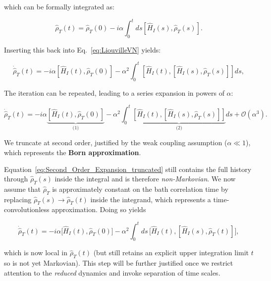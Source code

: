 \noindent
which can be formally integrated as:

\begin{equation}
	\hat{\rho}_T(t) = \hat{\rho}_T(0) - i \alpha \int_0^t ds [\hat{H}_I(s), \hat{\rho}_T(s)].
	\label{eq:Formal_Integration}
\end{equation}

\noindent
Inserting this back into Eq.~\eqref{eq:LiouvilleVN} yields:

\begin{equation}
	\dot{\hat{\rho}}_T(t) = -i \alpha \left[ \hat{H}_I(t), \hat{\rho}_T(0) \right]
	- \alpha^2 \int_0^t \left[ \hat{H}_I(t), \left[ \hat{H}_I(s), \hat{\rho}_T(s) \right] \right] ds,
	\label{eq:Second_Order_Expansion}
\end{equation}

\noindent
The iteration can be repeated, leading to a series expansion in powers of $\alpha$:

\begin{equation}
	\dot{\hat{\rho}}_T(t) = -i \alpha \underbrace{\left[ \hat{H}_I(t), \hat{\rho}_T(0) \right]}_{\text{(1)}}
	- \alpha^2 \int_0^t \underbrace{\left[ \hat{H}_I(t), \left[ \hat{H}_I(s), \hat{\rho}_T(s) \right] \right]}_{\text{(2)}} ds + \mathcal{O} (\alpha^3).
	\label{eq:Second_Order_Expansion_truncated}
\end{equation}

\noindent
We truncate at second order, justified by the weak coupling assumption ($\alpha \ll 1$), which represents the \textbf{Born approximation}.

\noindent
Equation~\eqref{eq:Second_Order_Expansion_truncated} still contains the full history through $\hat{\rho}_T(s)$ inside the integral and is therefore \emph{non-Markovian}. We now assume that $\hat{\rho}_T$ is approximately constant on the bath correlation time by replacing $\hat{\rho}_T(s) \to \hat{\rho}_T(t)$ inside the integrand, which represents a time-convolutionless approximation. Doing so yields

\begin{equation}
	\dot{\hat{\rho}}_T(t) = -i \alpha \big[ \hat{H}_I(t), \hat{\rho}_T(0) \big]
	- \alpha^2 \int_0^t ds\, \big[ \hat{H}_I(t), [ \hat{H}_I(s), \hat{\rho}_T(t)] \big],
	\label{eq:Second_Order_Expansion_wo_third}
\end{equation}

\noindent
which is now local in $\hat{\rho}_T(t)$ (but still retains an explicit upper integration limit $t$ so is not yet Markovian). This step will be further justified once we restrict attention to the \emph{reduced} dynamics and invoke separation of time scales.

